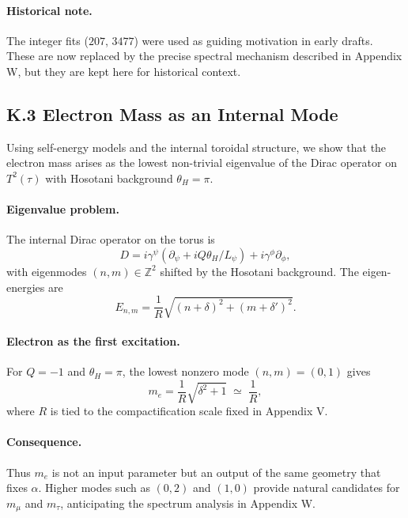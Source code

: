 \paragraph{Historical note.}  
The integer fits ($207$, $3477$) were used as guiding motivation in early drafts. These are now replaced by the precise spectral mechanism described in Appendix W, but they are kept here for historical context.

\subsection*{K.3 Electron Mass as an Internal Mode}
Using self-energy models and the internal toroidal structure, we show that the electron mass arises as the lowest non-trivial eigenvalue of the Dirac operator on $T^2(\tau)$ with Hosotani background $\theta_H=\pi$.

\paragraph{Eigenvalue problem.}  
The internal Dirac operator on the torus is
\begin{equation}
D = i\gamma^\psi \left(\partial_\psi + i Q \theta_H/L_\psi\right) + i\gamma^\phi \partial_\phi ,
\end{equation}
with eigenmodes $(n,m)\in\mathbb{Z}^2$ shifted by the Hosotani background. The eigen-energies are
\begin{equation}
E_{n,m} = \frac{1}{R}\sqrt{(n+\delta)^2 + (m+\delta')^2}.
\end{equation}

\paragraph{Electron as the first excitation.}  
For $Q=-1$ and $\theta_H=\pi$, the lowest nonzero mode $(n,m)=(0,1)$ gives
\begin{equation}
m_e = \frac{1}{R}\sqrt{\delta^2+1} \;\simeq\; \frac{1}{R},
\end{equation}
where $R$ is tied to the compactification scale fixed in Appendix V.

\paragraph{Consequence.}  
Thus $m_e$ is not an input parameter but an output of the same geometry that fixes $\alpha$. Higher modes such as $(0,2)$ and $(1,0)$ provide natural candidates for $m_\mu$ and $m_\tau$, anticipating the spectrum analysis in Appendix W.

